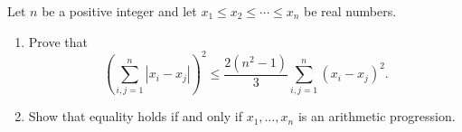 Let $n$ be a positive integer and let $x_1 \leq x_2 \leq \cdots \leq x_n$ be real numbers.
\begin{enumerate}
\item[(a)] Prove that
\[ \left( \sum_{i,j=1}^{n} |x_i - x_j| \right)^2 \leq \frac{2(n^2 - 1)}{3} \sum_{i,j=1}^{n} (x_i - x_j)^2. \]
\item[(b)] Show that equality holds if and only if $x_1, \ldots, x_n$ is an arithmetic progression.
\end{enumerate}
